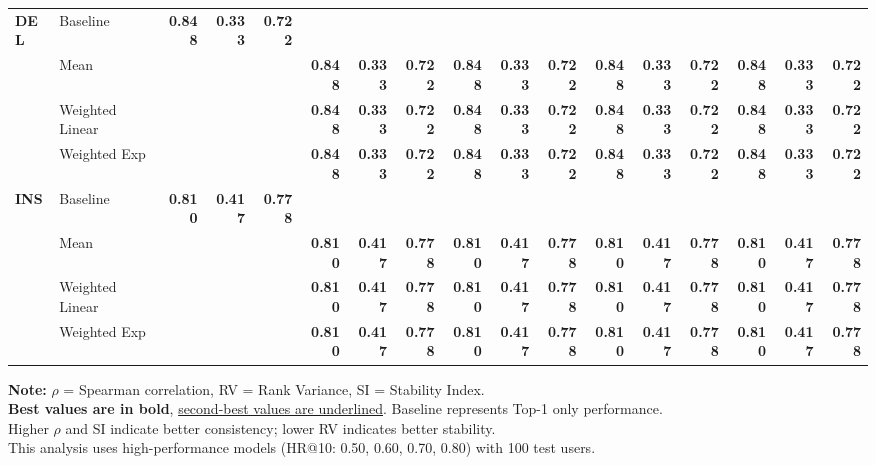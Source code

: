 \documentclass{article}
\begin{document}
\begin{table}[htbp]
\begin{tabular}{@{}llrrr|rrr|rrr|rrr|rrr@{}}
\multirow{4}{*}{\textbf{DEL}} 
& Baseline & \textbf{0.848} & \textbf{0.333} & \textbf{0.722} & & & & & & & & & & & & \\
& Mean & & & & \textbf{0.848} & \textbf{0.333} & \textbf{0.722} & \textbf{0.848} & \textbf{0.333} & \textbf{0.722} & \textbf{0.848} & \textbf{0.333} & \textbf{0.722} & \textbf{0.848} & \textbf{0.333} & \textbf{0.722} \\
& Weighted Linear & & & & \textbf{0.848} & \textbf{0.333} & \textbf{0.722} & \textbf{0.848} & \textbf{0.333} & \textbf{0.722} & \textbf{0.848} & \textbf{0.333} & \textbf{0.722} & \textbf{0.848} & \textbf{0.333} & \textbf{0.722} \\
& Weighted Exp & & & & \textbf{0.848} & \textbf{0.333} & \textbf{0.722} & \textbf{0.848} & \textbf{0.333} & \textbf{0.722} & \textbf{0.848} & \textbf{0.333} & \textbf{0.722} & \textbf{0.848} & \textbf{0.333} & \textbf{0.722} \\
\midrule

\multirow{4}{*}{\textbf{INS}} 
& Baseline & \textbf{0.810} & \textbf{0.417} & \textbf{0.778} & & & & & & & & & & & & \\
& Mean & & & & \textbf{0.810} & \textbf{0.417} & \textbf{0.778} & \textbf{0.810} & \textbf{0.417} & \textbf{0.778} & \textbf{0.810} & \textbf{0.417} & \textbf{0.778} & \textbf{0.810} & \textbf{0.417} & \textbf{0.778} \\
& Weighted Linear & & & & \textbf{0.810} & \textbf{0.417} & \textbf{0.778} & \textbf{0.810} & \textbf{0.417} & \textbf{0.778} & \textbf{0.810} & \textbf{0.417} & \textbf{0.778} & \textbf{0.810} & \textbf{0.417} & \textbf{0.778} \\
& Weighted Exp & & & & \textbf{0.810} & \textbf{0.417} & \textbf{0.778} & \textbf{0.810} & \textbf{0.417} & \textbf{0.778} & \textbf{0.810} & \textbf{0.417} & \textbf{0.778} & \textbf{0.810} & \textbf{0.417} & \textbf{0.778} \\

\bottomrule
\end{tabular}
\begin{flushleft}
\textbf{Note:} $\rho$ = Spearman correlation, RV = Rank Variance, SI = Stability Index. \\
\textbf{Best values are in bold}, \uline{second-best values are underlined}. Baseline represents Top-1 only performance. \\
Higher $\rho$ and SI indicate better consistency; lower RV indicates better stability. \\
This analysis uses high-performance models (HR@10: 0.50, 0.60, 0.70, 0.80) with 100 test users.
\end{flushleft}
\end{table}
\end{document}
